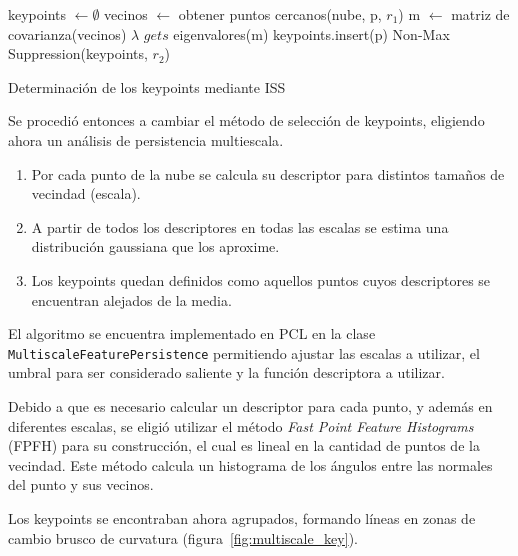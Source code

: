			\begin{algorithm}
				\begin{algorithmic}[1]
						\State keypoints $\gets\emptyset$
							\State vecinos $\gets$ obtener puntos cercanos(nube, p, $r_1$)
							\State m $\gets$ matriz de covarianza(vecinos)
							\State $\lambda$ $gets$ eigenvalores(m)
								\State keypoints.insert(p)
							\EndIf
						\EndFor
						\State\Return Non-Max Suppression(keypoints, $r_2$)
					\EndFunction
				\end{algorithmic}
				\caption{\label{alg:iss}Determinación de los keypoints mediante ISS}
			\end{algorithm}


			Se procedió entonces a cambiar el método de selección de keypoints, eligiendo ahora un análisis de persistencia multiescala\cite{Rusu:2009:FPF:1703435.1703733}.
			\begin{enumerate}
				\item Por cada punto de la nube se calcula su descriptor para distintos tamaños de vecindad (escala).
				\item A partir de todos los descriptores en todas las escalas se estima una distribución gaussiana que los aproxime.
				\item Los keypoints quedan definidos como aquellos puntos cuyos descriptores se encuentran alejados de la media.
			\end{enumerate}
			El algoritmo se encuentra implementado en PCL en la clase
			\texttt{Multiscale\-Feature\-Persistence} permitiendo ajustar las
			escalas a utilizar, el umbral para ser considerado saliente y la
			función descriptora a utilizar.

			Debido a que es necesario calcular un descriptor para cada punto, y
			además en diferentes escalas, se eligió utilizar el método
			\emph{Fast Point Feature Histograms} (FPFH) para su construcción,
			el cual es lineal en la cantidad de puntos de la vecindad.
			Este método calcula un histograma de los ángulos entre las normales del punto y sus vecinos\cite{Rusu:2009:FPF:1703435.1703733}.

			Los keypoints se encontraban ahora agrupados, formando líneas en zonas de cambio brusco de curvatura (figura~\ref{fig:multiscale_key}).





